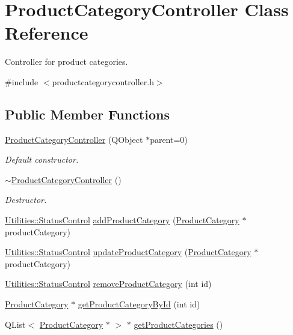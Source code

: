\hypertarget{class_product_category_controller}{\section{\-Product\-Category\-Controller \-Class \-Reference}
\label{class_product_category_controller}
}


\-Controller for product categories.  




{\ttfamily \#include $<$productcategorycontroller.\-h$>$}

\subsection*{\-Public \-Member \-Functions}
\begin{DoxyCompactItemize}
\item 
\hyperlink{class_product_category_controller_a60bcf6b0989cd8efb928af1a1e084f33}{\-Product\-Category\-Controller} (\-Q\-Object $\ast$parent=0)
\begin{DoxyCompactList}\small\item\em \-Default constructor. \end{DoxyCompactList}\item 
\hyperlink{class_product_category_controller_a0d6abe70a300d43f70aba5b129bdfc97}{$\sim$\-Product\-Category\-Controller} ()
\begin{DoxyCompactList}\small\item\em \-Destructor. \end{DoxyCompactList}\item 
\hyperlink{class_utilities_a2974f062d85bdb0c444a1cbe554bf228}{\-Utilities\-::\-Status\-Control} \hyperlink{class_product_category_controller_aa785ea1c646e9f71ad60c59124b2f3da}{add\-Product\-Category} (\hyperlink{class_product_category}{\-Product\-Category} $\ast$product\-Category)
\item 
\hyperlink{class_utilities_a2974f062d85bdb0c444a1cbe554bf228}{\-Utilities\-::\-Status\-Control} \hyperlink{class_product_category_controller_a5e0cc2bae88f7974ee353878e5a89bce}{update\-Product\-Category} (\hyperlink{class_product_category}{\-Product\-Category} $\ast$product\-Category)
\item 
\hyperlink{class_utilities_a2974f062d85bdb0c444a1cbe554bf228}{\-Utilities\-::\-Status\-Control} \hyperlink{class_product_category_controller_ab598ec7ed7e53f303edd1df412e209a9}{remove\-Product\-Category} (int id)
\item 
\hyperlink{class_product_category}{\-Product\-Category} $\ast$ \hyperlink{class_product_category_controller_ae9b08f8a3dac4fb138905a0f398d932d}{get\-Product\-Category\-By\-Id} (int id)
\item 
\-Q\-List$<$ \hyperlink{class_product_category}{\-Product\-Category} $\ast$ $>$ $\ast$ \hyperlink{class_product_category_controller_a9f8c897fc045101568fdf4c882d97d13}{get\-Product\-Categories} ()
\end{DoxyCompactItemize}


